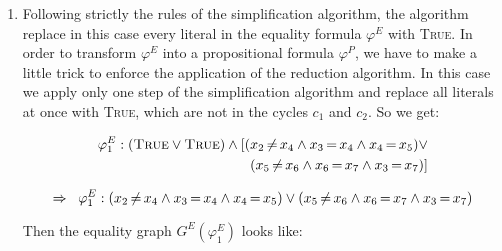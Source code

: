 {\begin{enumerate}
%

The equality graph has two contradictory cycles, $%
c_{1}=(x_{2},x_{3},x_{4})$ and $%
c_{2}=(x_{3},x_{4},x_{5},x_{6},x_{7})$.

\item 
Following strictly the rules of the simplification algorithm, the algorithm
replace in this case every literal in the equality formula $\varphi ^{E}$
with \textsc{True}. In order to transform $\varphi ^{E}$ into a
propositional formula $\varphi ^{P}$, we have to make a little trick to
enforce the application of the reduction algorithm. In this case we apply
only one step of the simplification algorithm and replace all literals at
once with \textsc{True}, which are not in the cycles $c_{1}$ and $c_{2}$. So
we get:

\begin{eqnarray*}
\varphi _{1}^{E}:(\text{\textsc{True}}\vee \text{\textsc{True}})\wedge [
(x_{2}\,{\neq}\,x_{4}\wedge x_{3}\,{=}\,x_{4}\wedge x_{4}\,{=}
\,x_{5})\vee \\
(x_{5}\,{\neq}\,x_{6}\wedge x_{6}\,{=}\,x_{7}\wedge x_{3}\,{=}\,x_{7})]
\end{eqnarray*}

\begin{equation*}
\Rightarrow \;\;\varphi _{1}^{E}:(x_{2}\,{\neq}\,x_{4}\wedge x_{3}\,{=}\,x_{4}\wedge x_{4}\,{=}
\,x_{5})\vee \\
(x_{5}\,{\neq}\,x_{6}\wedge x_{6}\,{=}\,x_{7}\wedge x_{3}\,{=}\,x_{7})
\end{equation*}

Then the equality graph $G^{E}(\varphi _{1}^{E})$ looks like:


\end{enumerate}}
